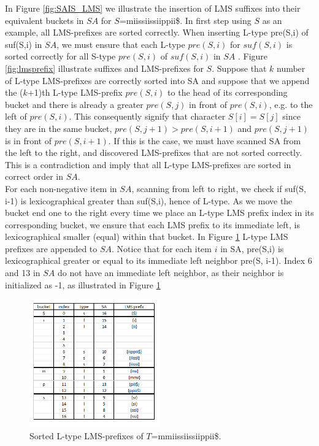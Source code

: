 \documentclass[12pt]{article} %
\begin{document}
In Figure \ref{fig:SAIS_LMS} we illustrate the insertion of LMS suffixes into their equivalent buckets in $SA$ for $S$=miissiissiippii\$. In first step using $S$ as an example, all LMS-prefixes are sorted correctly. When inserting L-type pre(S,i) of suf(S,i) in $SA$, we must ensure that each L-type $pre(S,i)$ for $suf(S,i)$ is sorted correctly for all S-type $pre(S,i)$ of $suf(S,i)$ in $SA$ \cite{twoeffecient}. Figure \ref{fig:lmsprefix} illustrate suffixes and LMS-prefixes for $S$. Suppose that $k$ number of L-type LMS-prefixes are correctly sorted into SA and suppose that we append the ($k$+1)th L-type LMS-prefix $pre(S,i)$ to the head of its corresponding bucket and there is already a greater $pre(S,j)$ in front of $pre(S,i)$, e.g. to the left of $pre(S,i)$. This consequently signify that character $S[i]=S[j]$ since they are in the same bucket, $pre(S, j+1) > pre(S, i+1)$ and $pre(S, j+1)$ is in front of $pre(S, i+1)$. If this is the case, we must have scanned SA from the left to the right, and discovered LMS-prefixes that are not sorted correctly. This is a contradiction and imply that all L-type LMS-prefixes are sorted in correct order in $SA$. \\
For each non-negative item in $SA$, scanning from left to right, we check if suf(S, i-1) is lexicographical greater than suf(S,i), hence of L-type. As we move the bucket end one to the right every time we place an L-type LMS prefix index in its corresponding bucket, we ensure that each LMS prefix  to its immediate left, is lexicographical smaller (equal) within that bucket. In Figure \ref{fig:lmssortedl} L-type LMS prefixes are appended to $SA$. Notice that for each item $i$ in SA, pre(S,i) is lexicographical greater or equal to its immediate left neighbor pre(S, i-1). Index 6 and 13 in $SA$ do not have an immediate left neighbor, as their neighbor is initialized as -1, as illustrated in Figure \ref{fig:lmssortedl}   
\begin{figure}[H]
    \centering
    \includegraphics[width=0.5\textwidth]{lmssortedl}
    \captionsetup{width=0.8\textwidth}
    \caption{Sorted L-type LMS-prefixes of  $T$=mmiissiissiippii\$.}
    \label{fig:lmssortedl}  
\end{figure}
\end{document}
